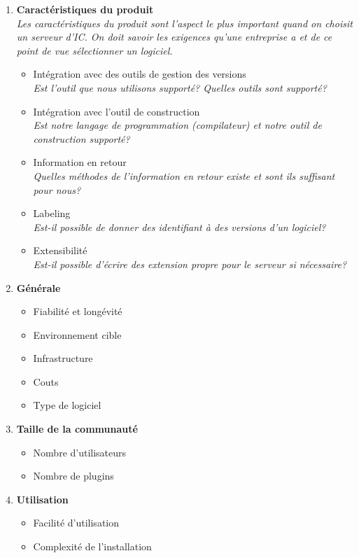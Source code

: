 \begin{enumerate}
\item \textbf{Caractéristiques du produit} \\
\textit{Les caractéristiques du produit sont l'aspect le plus important quand on choisit un serveur d'IC. On doit savoir les exigences qu'une entreprise a et de ce point de vue sélectionner un logiciel.}
	\begin{itemize}
		\item Intégration avec des outils de gestion des versions \\
		\textit{Est l'outil que nous utilisons supporté? Quelles outils sont supporté?}
		\item Intégration avec l'outil de construction \\
		\textit{Est notre langage de programmation (compilateur) et notre outil de construction supporté?}
		\item Information en retour \\
		\textit{Quelles méthodes de l'information en retour existe et sont ils suffisant pour nous?}
		\item Labeling \\
		\textit{Est-il possible de donner des identifiant à des versions d'un logiciel?}
		\item Extensibilité \\
		\textit{Est-il possible d'écrire des extension propre pour le serveur si nécessaire?}
	\end{itemize}
\item \textbf{Générale}
	\begin{itemize}
		\item Fiabilité et longévité
		\item Environnement cible
		\item Infrastructure
		\item Couts
		\item Type de logiciel
	\end{itemize}
\item \textbf{Taille de la communauté}
	\begin{itemize}
		\item Nombre d'utilisateurs
		\item Nombre de plugins
	\end{itemize}
\item \textbf{Utilisation}
	\begin{itemize}
		\item Facilité d'utilisation
		\item Complexité de l'installation
	\end{itemize}
\end{enumerate}
